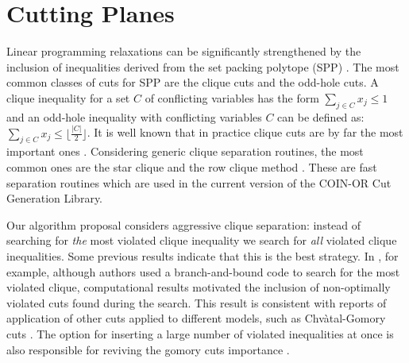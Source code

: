\documentclass{endm}
\begin{document}
\section{Cutting Planes}\label{cut}

Linear programming relaxations can be significantly strengthened by the inclusion of inequalities derived from the set packing polytope (SPP) \cite {Padberg1973}. The most common classes of cuts for SPP are the clique cuts and the odd-hole cuts. A clique inequality for a set $C$ of conflicting variables has the form $\sum_{j\in C}x_{j} \leq 1$ and an odd-hole inequality with conflicting variables $C$ can be defined as: $\sum_{j\in C}x_{j} \leq \lfloor \frac{|C|}{2}\rfloor$. It is well known that in practice clique cuts are by far the most important ones \cite{Borndorfer1998}. Considering generic clique separation routines, the most common ones are the star clique and the row clique method \cite{Eso1999a,Hoffman1993,Borndorfer1998}. These are fast separation routines which are used in the current version of the COIN-OR\cite{LougeeHeimer2003} Cut Generation Library.  

Our algorithm proposal considers aggressive clique separation: instead of searching for \emph{the} most violated clique inequality we search for \emph{all} violated clique inequalities. Some previous results indicate that this is the best strategy. In \cite{Marecek2012}, for example, although authors used a branch-and-bound code to search for the most violated clique, computational results motivated the inclusion of non-optimally violated cuts found during the search. This result is consistent with reports of application of other cuts applied to different models, such as {C}hv\`{a}tal-Gomory cuts \cite{Fischetti2007}. The option for inserting a large number of violated inequalities at once is also responsible for reviving the gomory cuts importance \cite {Cornuejols2007}.
\end{document}
